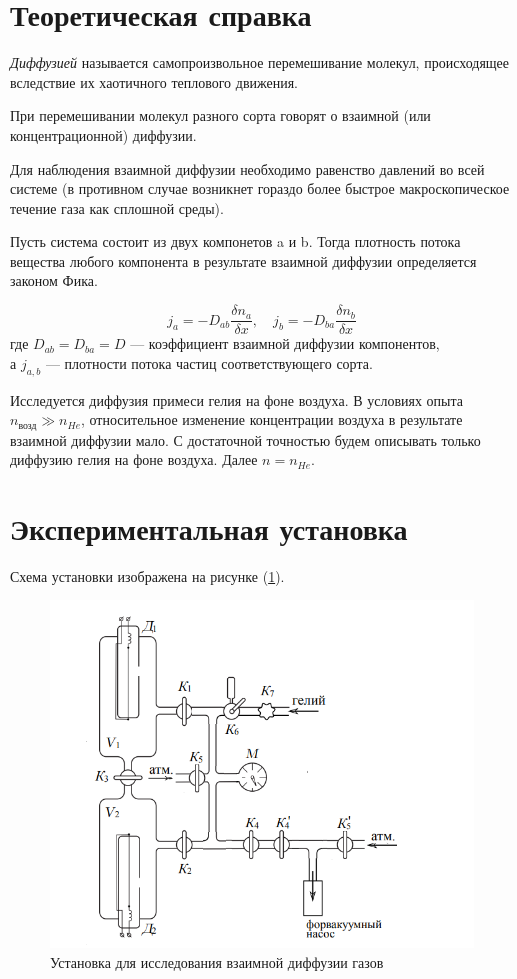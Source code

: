 \documentclass[a4paper,12pt]{article} %
\begin{document}
\section*{Теоретическая справка}

\textit{Диффузией} называется самопроизвольное перемешивание молекул, происходящее вследствие их хаотичного теплового движения.

При перемешивании молекул разного сорта говорят о взаимной (или концентрационной) диффузии. 

Для наблюдения взаимной диффузии необходимо равенство давлений во всей системе (в противном случае возникнет гораздо более быстрое макроскопическое течение газа как сплошной среды).

\medskip

Пусть система состоит из двух компонетов a и b. 
Тогда плотность потока вещества любого компонента в результате взаимной диффузии определяется законом Фика. 

\begin{equation}
  j_a = - D_{ab} \frac{\delta n_a}{\delta x}, \quad j_b = - D_{ba} \frac{\delta n_b}{\delta x}
\end{equation}
где $D_{ab} = D_{ba} = D$ — коэффициент взаимной диффузии компонентов,\\ а $j_{a,b}$ — плотности потока частиц соответствующего сорта.

Исследуется диффузия примеси гелия на фоне воздуха. В условиях опыта $n_{\text{возд}} \gg n_{He}$, относительное изменение концентрации воздуха в результате взаимной диффузии мало. С достаточной точностью будем описывать только диффузию гелия на фоне воздуха. Далее $n = n_{He}$.

\section*{Экспериментальная установка}

Схема установки изображена на рисунке (\ref{fig:dr1}). 

\begin{figure}[h]
  \centering
  \includegraphics[scale = 0.6]{drawing1.jpg}
  \caption{Установка для исследования взаимной диффузии газов}
  \label{fig:dr1}
\end{figure}
\end{document}
